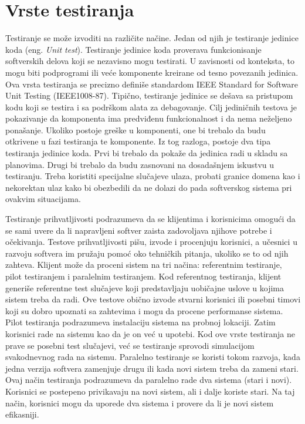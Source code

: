 \documentclass[12pt,oneside]{memoir}
\begin{document}
\section{Vrste testiranja} \label{broj2}
Testiranje se može izvoditi na različite načine. Jedan od njih je testiranje jedinice koda (eng. \textit{Unit test}). Testiranje jedinice koda proverava funkcionisanje softverskih delova koji se nezavisno mogu testirati. U zavisnosti od konteksta, to mogu biti podprogrami ili veće komponente kreirane od tesno povezanih jedinica. Ova vrsta testiranja se precizno definiše standardom IEEE Standard for Software Unit Testing (IEEE1008-87). Tipično, testiranje jedinice se dešava sa pristupom kodu koji se testira i sa podrškom alata za debagovanje. Cilj jediničnih testova je pokazivanje da komponenta ima predviđenu funkcionalnost i da nema neželjeno ponašanje. Ukoliko postoje greške u komponenti, one bi trebalo da budu otkrivene u fazi testiranja te komponente. Iz tog razloga, postoje dva tipa testiranja jedinice koda. Prvi bi trebalo da pokaže da jedinica radi u skladu sa planovima. Drugi bi trebalo da budu zasnovani na dosadašnjem iskustvu u testiranju. Treba koristiti specijalne slučajeve ulaza, probati granice domena kao i nekorektan ulaz kako bi obezbedili da ne dolazi do pada softverskog sistema pri ovakvim situacijama.
\par
Testiranje prihvatljivosti podrazumeva da se klijentima i korisnicima omogući da se sami uvere da li napravljeni softver zaista zadovoljava njihove potrebe i očekivanja. Testove prihvatljivosti pišu, izvode i procenjuju korisnici, a učesnici u razvoju softvera im pružaju pomoć oko tehničkih pitanja, ukoliko se to od njih zahteva. Klijent može da proceni sistem na tri načina: referentnim testiranje, pilot testiranjem i paralelnim testiranjem. Kod referentnog testiranja, klijent generiše referentne test slučajeve koji predstavljaju uobičajne uslove u kojima sistem treba da radi. Ove testove obično izvode stvarni korisnici ili posebni timovi koji su dobro upoznati sa zahtevima i mogu da procene performanse sistema. Pilot testiranja podrazumeva instalaciju sistema na probnoj lokaciji. Zatim korisnici rade na sistemu kao da je on već u upotebi. Kod ove vrste testiranja ne prave se posebni test slučajevi, već se testiranje sprovodi simulacijom svakodnevnog rada na sistemu. Paralelno testiranje se koristi tokom razvoja, kada jedna verzija softvera zamenjuje drugu ili kada novi sistem treba da zameni stari. Ovaj način testiranja podrazumeva da paralelno rade dva sistema (stari i novi). Korisnici se postepeno privikavaju na novi sistem, ali i dalje koriste stari. Na taj način, korisnici mogu da uporede dva sistema i provere da li je novi sistem efikasniji.
\end{document}
